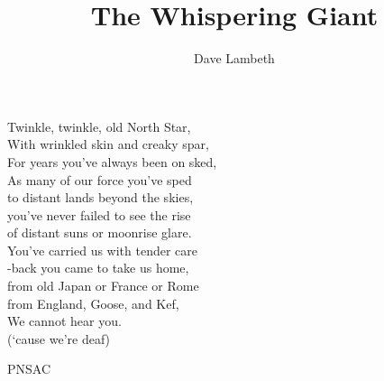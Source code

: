 %


\title{The Whispering Giant}
\author{Dave Lambeth}

\maketitle

Twinkle, twinkle, old North Star,\\
With wrinkled skin and creaky
spar,\\
For years you’ve always been on
sked,\\
As many of our force you’ve sped\\
to distant lands beyond the skies,\\
you’ve never failed to see the rise\\
of distant suns or moonrise glare.\\
You’ve carried us with tender care\\
-back you came to take us home,\\
from old Japan or France or Rome\\
from England, Goose, and Kef,\\
We cannot hear you.\\
(‘cause we’re deaf)\\



\begin{footnotesize}
    \raggedleft PNSAC\\
\end{footnotesize}



